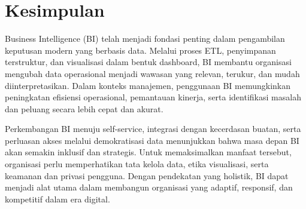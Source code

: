 \section{Kesimpulan}

Business Intelligence (BI) telah menjadi fondasi penting dalam pengambilan keputusan modern yang berbasis data. Melalui proses ETL, penyimpanan terstruktur, dan visualisasi dalam bentuk dashboard, BI membantu organisasi mengubah data operasional menjadi wawasan yang relevan, terukur, dan mudah diinterpretasikan. Dalam konteks manajemen, penggunaan BI memungkinkan peningkatan efisiensi operasional, pemantauan kinerja, serta identifikasi masalah dan peluang secara lebih cepat dan akurat.

Perkembangan BI menuju self-service, integrasi dengan kecerdasan buatan, serta perluasan akses melalui demokratisasi data menunjukkan bahwa masa depan BI akan semakin inklusif dan strategis. Untuk memaksimalkan manfaat tersebut, organisasi perlu memperhatikan tata kelola data, etika visualisasi, serta keamanan dan privasi pengguna. Dengan pendekatan yang holistik, BI dapat menjadi alat utama dalam membangun organisasi yang adaptif, responsif, dan kompetitif dalam era digital.

